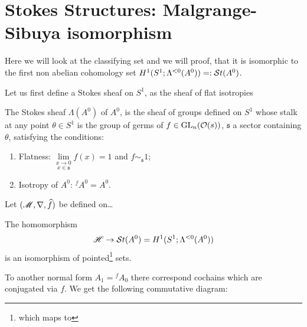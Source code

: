 \section{Stokes Structures: Malgrange-Sibuya isomorphism}
\begin{comment}
  \begin{itemize}
    \item \cite{Loday1994} Thm I.2.1
    \item \cite{Loday2014} Thm. 4.3.9, on p. 78
    \item \cite{sabbah2007isomonodromic} Thm II.6.2
  \end{itemize}
\end{comment}
Here we will look at the classifying set and we will proof, that it is
isomorphic \TODO[as\dots] to the first non abelian cohomology set
$H^1(S^1;\Lambda^{<0}(A^0))=:\mathcal{S}{}t(A^0)$.

Let us first define a Stokes sheaf on $S^1$, as the sheaf of flat
isotropies\TODO[\dots]
\begin{defn}
  The Stokes sheaf $\Lambda(A^0)$ of $A^0$, is the sheaf of groups defined on
  $S^1$ whose stalk at any point $\theta\in S^1$ is the group of germs of
  $f\in\operatorname{GL}_n(\mathcal{O}(s))$, $\mathfrak{s}$ a sector containing $\theta$, satisfying
  the conditions:
  \begin{enumerate}
    \item Flatness: $\underset{x\in\mathfrak{s}}{\underset{x\to0}{\lim}}f(x)=1$
      and $f\sim_{\mathfrak{s}} 1$;
    \item Isotropy of $A^0$: ${}^f\!A^0=A^0$.
  \end{enumerate}
\end{defn}

Let $(\mathscr{M},\nabla,\widehat f)$ be defined on\dots

\begin{thm}
  The homomorphism 
  \[
    \mathscr{H}\to\mathcal{S}{}t(A^0)=H^1(S^1;\Lambda^{<0}(A^0))
  \]
  is an isomorphism of pointed\footnote{which maps \TODO{} to \TODO{}} sets.
\end{thm}
\begin{rem}
  To another normal form $A_1={}^f\!A_0$ there correspond cochains which are
  conjugated via $f$.
  We get the following commutative diagram:
  \TODO{}
\end{rem}



